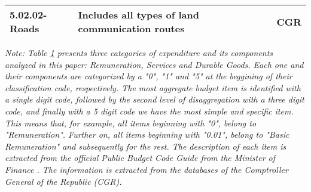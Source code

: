 \begin{table}[ht]
\begin{center}
{\begin{tabular}{l l l}
5.02.02-Roads & Includes all types of land communication routes & CGR\\
\hline
\hline
\end{tabular}}
\end{center}
\label{table:expenditures}
\footnotesize
\textit{Note: Table \ref{table:expenditures} presents three categories of expenditure and its components analyzed in this paper: Remuneration, Services and Durable Goods. Each one and their components are categorized by a "0", "1" and "5" at the beggining of their classification code, respectively. The most aggregate budget item is identified with a single digit code, followed by the second level of disaggregation with a three digit code, and finally with a 5 digit code we have the most simple and specific item. This means that, for example, all items beginning with "0", belong to "Remuneration". Further on, all items beginning with "0.01", belong to "Basic Remuneration" and subsequently for the rest. The description of each item is extracted from the official Public Budget Code Guide from the Minister of Finance \parencite{Finance2018}. The information is extracted from the databases of the Comptroller General of the Republic (CGR).}
\end{table}